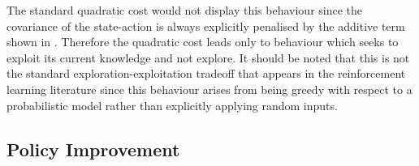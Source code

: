 The standard quadratic cost would not display this behaviour since the covariance of the state-action is always explicitly penalised by the additive term shown in . Therefore the quadratic cost leads only to behaviour which seeks to exploit its current knowledge and not explore. It should be noted that this is not the standard exploration-exploitation tradeoff that appears in the reinforcement learning literature since this behaviour arises from being greedy with respect to a probabilistic model rather than explicitly applying random inputs.






\subsection{Policy Improvement}

